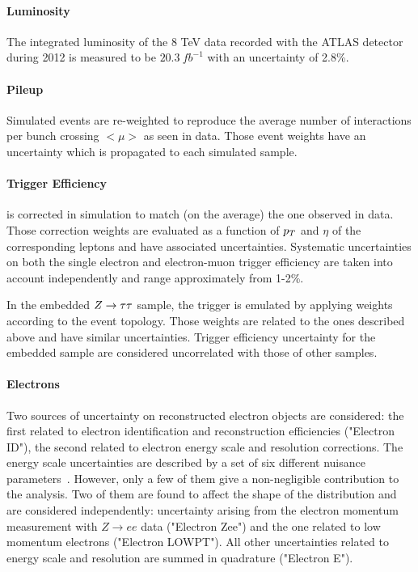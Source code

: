 \paragraph{Luminosity}
The integrated luminosity of the 8 TeV data recorded with the ATLAS detector during 2012 is measured 
to be $20.3 ~ fb^{-1}$ \cite{luminosity} with an uncertainty  of  2.8\%.

\paragraph{Pileup}
Simulated events are re-weighted to reproduce the average number of interactions per bunch crossing $<\mu>$ as seen in data. 
Those event weights have an uncertainty which is propagated to each simulated sample.

\paragraph{Trigger Efficiency}
is corrected in simulation to match (on the average) the one observed in data. Those correction weights 
are evaluated as a function of $p_{T}$ and $\eta$ of the corresponding leptons and have associated uncertainties. 
Systematic uncertainties on both the single electron and electron-muon trigger efficiency are taken into account 
independently and range approximately from 1-2\%.

In the embedded $Z\rightarrow \tau\tau$ sample, the trigger is emulated by applying weights  according to  the event
topology. Those weights are related to the ones described above
and have similar uncertainties. Trigger efficiency uncertainty for the embedded sample 
 are considered uncorrelated with those of other samples.

\paragraph{Electrons}
Two sources of uncertainty on reconstructed electron objects are considered:
the first  related to electron identification and reconstruction efficiencies ("Electron ID"), 
the second  related to electron energy scale and resolution corrections.
The energy scale uncertainties are described by a set of six different nuisance parameters~\cite{eleEnergy}.
However, only a few of them give a non-negligible contribution to the analysis. Two of them are found
to affect the shape of the \mmc distribution and are considered independently: uncertainty
arising from the electron  momentum measurement with $Z \rightarrow ee$ data ("Electron Zee") 
and the one related to low momentum electrons ("Electron LOWPT"). 
All other uncertainties related to energy scale and resolution are summed in quadrature ("Electron E").

